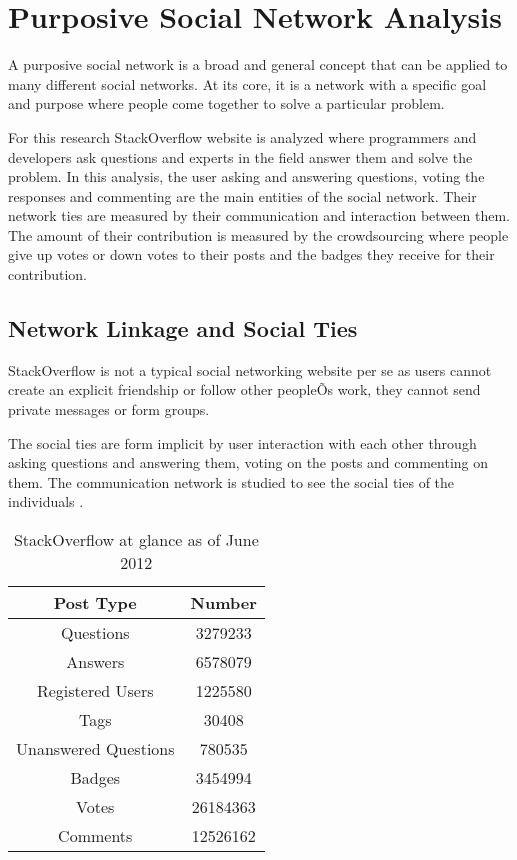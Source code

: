 

\chapter{Purposive Social Network Analysis} \label{Chapter:Purposive Social Network Analysis}

A purposive social network is a broad and general concept that can be applied to many different social networks. At its core, it is a network with a specific goal and purpose where people come together to solve a particular problem.

For this research StackOverflow website is analyzed where programmers and developers ask questions and experts in the field answer them and solve the problem. In this analysis, the user asking and answering questions, voting the responses and commenting are the main entities of the social network. Their network ties are measured by their communication and interaction between them. The amount of their contribution is measured by the crowdsourcing where people give up votes or down votes to their posts and the badges they receive for their contribution.


\section{Network Linkage and Social Ties}

StackOverflow is not a typical social networking website per se as users cannot create an explicit friendship or follow other peopleÕs work, they cannot send private messages or form groups.

The social ties are form implicit by user interaction with each other through asking questions and answering them, voting on the posts and commenting on them. The communication network is studied to see the social ties of the individuals \cite{monge2003theories}.

\begin{table}[!htb]
  \centering
  \begin{tabular}{cc}
  \toprule
  \textbf{Post Type} & \textbf{Number}\\
  \midrule
   Questions & 3279233\\   \midrule
   Answers & 6578079\\   \midrule
   Registered Users & 1225580\\   \midrule
   Tags & 30408 \\   \midrule
   Unanswered Questions & 780535\\   \midrule
   Badges & 3454994\\   \midrule
   Votes & 26184363\\   \midrule
   Comments & 12526162\\ 
  \bottomrule
  \end{tabular}
  \caption{StackOverflow at glance as of June 2012}
  \label{Table:tabex}
\end{table}

